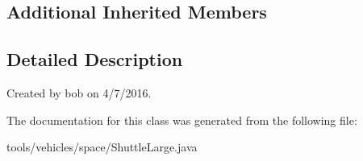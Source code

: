 \subsection*{Additional Inherited Members}


\subsection{Detailed Description}
Created by bob on 4/7/2016. 

The documentation for this class was generated from the following file\+:\begin{DoxyCompactItemize}
\item 
tools/vehicles/space/Shuttle\+Large.\+java\end{DoxyCompactItemize}
